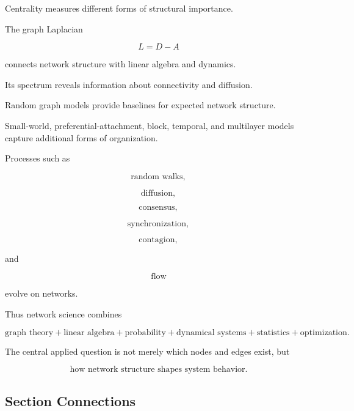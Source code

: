 Centrality measures different forms of structural importance.

The graph Laplacian

\[
\boxed{
L=D-A
}
\]

connects network structure with linear algebra and dynamics.

Its spectrum reveals information about connectivity and diffusion.

Random graph models provide baselines for expected network structure.

Small-world, preferential-attachment, block, temporal, and multilayer models
capture additional forms of organization.

Processes such as

\[
\boxed{
\text{random walks},
}
\]

\[
\boxed{
\text{diffusion},
}
\]

\[
\boxed{
\text{consensus},
}
\]

\[
\boxed{
\text{synchronization},
}
\]

\[
\boxed{
\text{contagion},
}
\]

and

\[
\boxed{
\text{flow}
}
\]

evolve on networks.

Thus network science combines

\[
\boxed{
\text{graph theory}
+
\text{linear algebra}
+
\text{probability}
+
\text{dynamical systems}
+
\text{statistics}
+
\text{optimization}.
}
\]

The central applied question is not merely which nodes and edges exist, but

\[
\boxed{
\text{how network structure shapes system behavior}.
}
\]

\subsection{Section Connections}
\label{subsec:network-science-connections}



